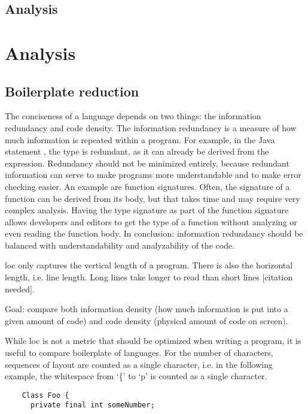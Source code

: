 
\subsection{Analysis}
\label{sec:evaluation__testing__analysis}


\section{Analysis}
\label{sec:evaluation__analysis}


\subsection{Boilerplate reduction}
\label{subsec:evaluation__analysis__boilerplate_reduction}

The conciseness of a language depends on two things: the information redundancy and code density.
The information redundancy is a measure of how much information is repeated within a program.
For example, in the Java statement , the type  is redundant, as it can already be derived from the expression.
Redundancy should not be minimized entirely, because redundant information can serve to make programs more understandable and to make error checking easier.
An example are function signatures.
Often, the signature of a function can be derived from its body, but that takes time and may require very complex analysis.
Having the type signature as part of the function signature allows developers and editors to get the type of a function without analyzing or even reading the function body.
In conclusion: information redundancy should be balanced with understandability and analyzability of the code.

\Ac{loc} only captures the vertical length of a program.
There is also the horizontal length, i.e. line length.
Long lines take longer to read than short lines [citation needed].


Goal: compare both information density (how much information is put into a given amount of code) and code density (physical amount of code on screen).

While \ac{loc} is not a metric that should be optimized when writing a program, it is useful to compare boilerplate of languages.
For the number of characters, sequences of layout are counted as a single character, i.e. in the following example, the whitespace from `\{' to `p' is counted as a single character.
\begin{lstlisting}
    Class Foo {
      private final int someNumber;
\end{lstlisting}


